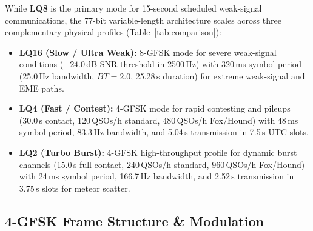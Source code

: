 While \textbf{LQ8} is the primary mode for 15-second scheduled weak-signal communications, the 77-bit variable-length architecture scales across three complementary physical profiles (Table~\ref{tab:comparison}):
\begin{itemize}[leftmargin=1.2em, topsep=1.5pt plus 1.5pt minus 0.5pt, itemsep=0.8pt plus 1.2pt minus 0.4pt, parsep=0pt]
  \item \textbf{LQ16 (Slow / Ultra Weak):} 8-GFSK mode for severe weak-signal conditions ($-24.0$\,dB SNR threshold in 2500\,Hz) with 320\,ms symbol period (25.0\,Hz bandwidth, $BT = 2.0$, 25.28\,s duration) for extreme weak-signal and EME paths.
  \item \textbf{LQ4 (Fast / Contest):} 4-GFSK mode for rapid contesting and pileups (30.0\,s contact, $120$\,QSOs/h standard, $480$\,QSOs/h Fox/Hound) with 48\,ms symbol period, 83.3\,Hz bandwidth, and 5.04\,s transmission in 7.5\,s UTC slots.
  \item \textbf{LQ2 (Turbo Burst):} 4-GFSK high-throughput profile for dynamic burst channels (15.0\,s full contact, $240$\,QSOs/h standard, $960$\,QSOs/h Fox/Hound) with 24\,ms symbol period, 166.7\,Hz bandwidth, and 2.52\,s transmission in 3.75\,s slots for meteor scatter.
\end{itemize}

\subsection{4-GFSK Frame Structure \& Modulation}

